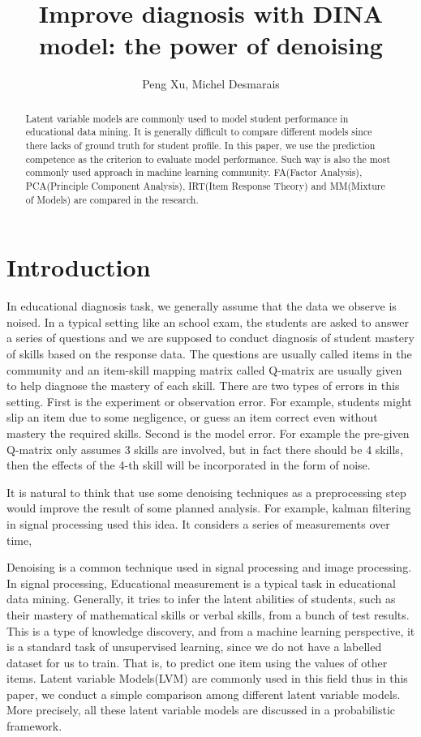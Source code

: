 \documentclass[11pt]{article}
\begin{document}
\title{\bf\Large Improve diagnosis with DINA model: the power of denoising}
\author{Peng Xu, Michel Desmarais}
\date{}
\maketitle

\begin{abstract}
Latent variable models are commonly used to model student performance in educational data mining. It is generally difficult to compare different models since there lacks of ground truth for student profile. In this paper, we use the prediction competence as the criterion to evaluate model performance. Such way is also the most commonly used approach in machine learning community. FA(Factor Analysis), PCA(Principle Component Analysis), IRT(Item Response Theory) and MM(Mixture of Models) are compared in the research.
\end{abstract}

\section{Introduction}
In educational diagnosis task, we generally assume that the data we observe is noised. In a typical setting like an school exam, the students are asked to answer a series of questions and we are supposed to conduct diagnosis of student mastery of skills based on the response data. The questions are usually called items in the community and an item-skill mapping matrix called Q-matrix are usually given to help diagnose the mastery of each skill. There are two types of errors in this setting. First is the experiment or observation error. For example, students might slip an item due to some negligence, or guess an item correct even without mastery the required skills. Second is the model error. For example the pre-given Q-matrix only assumes 3 skills are involved, but in fact there should be 4 skills, then the effects of the 4-th skill will be incorporated in the form of noise. 

It is natural to think that use some denoising techniques as a preprocessing step would improve the result of some planned analysis. For example, kalman filtering in signal processing used this idea. It considers a series of measurements over time, 

Denoising is a common technique used in signal processing and image processing. In signal processing, 
Educational measurement is a typical task in educational data mining. Generally, it tries to infer the latent abilities of students, such as their mastery of mathematical skills or verbal skills, from a bunch of test results. This is a type of knowledge discovery, and from a machine learning perspective, it is a standard task of unsupervised learning, since we do not have a labelled dataset for us to train. That is, to predict one item using the values of other items. Latent variable Models(LVM)\cite{bartholomew2011latent} are commonly used in this field thus in this paper, we conduct a simple comparison among different latent variable models. More precisely, all these latent variable models are discussed in a probabilistic framework.
\end{document}
